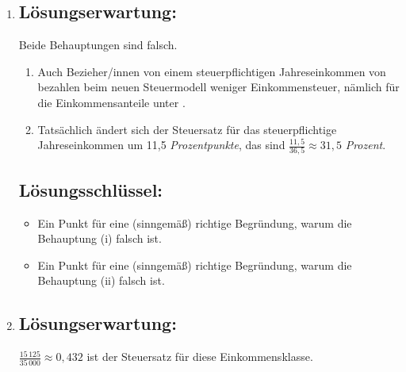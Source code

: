 \begin{langesbeispiel}
{\begin{enumerate}
	\subsection{Lösungsschlüssel:}
	
\begin{itemize}
	\item Ein Punkt für die richtige Lösung.
	
	Toleranzintervall: $[0,28;0,29]$ bzw. $[28\,\%; 29\,\%]$
	\item   Ein Punkt für eine (sinngemäß) richtige Interpretation.
\end{itemize}

\item \subsection{Lösungserwartung:}
			
Beide Behauptungen sind falsch.

\begin{enumerate}
	\item Auch  Bezieher/innen von einem steuerpflichtigen Jahreseinkommen von  bezahlen beim neuen Steuermodell weniger Einkommensteuer, nämlich für die Einkommensanteile unter . 
	\item Tatsächlich ändert sich der Steuersatz für das steuerpflichtige Jahreseinkommen um 11,5 \textit{Prozentpunkte}, das sind $\frac{11,5}{36,5}\approx 31,5$ \textit{Prozent}.
\end{enumerate}

	\subsection{Lösungsschlüssel:}
	
\begin{itemize}
	\item Ein Punkt für eine (sinngemäß) richtige Begründung, warum die Behauptung (i) falsch ist.
	\item Ein Punkt für eine (sinngemäß) richtige Begründung, warum die Behauptung (ii) falsch ist.
\end{itemize}

\item \subsection{Lösungserwartung:}
			
$\frac{15\,125}{35\,000}\approx 0,432$ ist der Steuersatz für diese Einkommensklasse.


\end{enumerate}}
\end{langesbeispiel}
